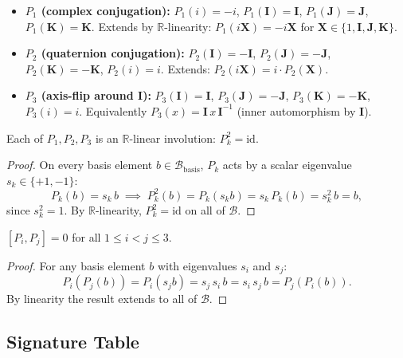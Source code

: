 \begin{itemize}
  \item \textbf{$P_1$ (complex conjugation):}
    $P_1(i) = -i$,\; $P_1(\mathbf{I}) = \mathbf{I}$,\;
    $P_1(\mathbf{J}) = \mathbf{J}$,\; $P_1(\mathbf{K}) = \mathbf{K}$.
    Extends by $\mathbb{R}$-linearity: $P_1(i\mathbf{X}) = -i\mathbf{X}$
    for $\mathbf{X} \in \{1, \mathbf{I}, \mathbf{J}, \mathbf{K}\}$.

  \item \textbf{$P_2$ (quaternion conjugation):}
    $P_2(\mathbf{I}) = -\mathbf{I}$,\;
    $P_2(\mathbf{J}) = -\mathbf{J}$,\;
    $P_2(\mathbf{K}) = -\mathbf{K}$,\; $P_2(i) = i$.
    Extends: $P_2(i\mathbf{X}) = i\cdot P_2(\mathbf{X})$.

  \item \textbf{$P_3$ (axis-flip around $\mathbf{I}$):}
    $P_3(\mathbf{I}) = \mathbf{I}$,\;
    $P_3(\mathbf{J}) = -\mathbf{J}$,\;
    $P_3(\mathbf{K}) = -\mathbf{K}$,\; $P_3(i) = i$.
    Equivalently $P_3(x) = \mathbf{I}\, x\, \mathbf{I}^{-1}$ (inner automorphism by $\mathbf{I}$).
\end{itemize}

\begin{lemma}[Involutions]
  \label{lem:involutions}
  Each of $P_1, P_2, P_3$ is an $\mathbb{R}$-linear involution: $P_k^2 = \mathrm{id}$.
\end{lemma}

\begin{proof}
  On every basis element $b \in \mathcal{B}_\mathrm{basis}$, $P_k$ acts by a
  scalar eigenvalue $s_k \in \{+1, -1\}$:
  \[
    P_k(b) = s_k\, b \;\implies\; P_k^2(b) = P_k(s_k b) = s_k\, P_k(b)
    = s_k^2\, b = b,
  \]
  since $s_k^2 = 1$. By $\mathbb{R}$-linearity, $P_k^2 = \mathrm{id}$ on
  all of $\mathcal{B}$.
\end{proof}

\begin{lemma}
  \label{lem:commutativity}
  $[P_i, P_j] = 0$ for all $1 \le i < j \le 3$.
\end{lemma}

\begin{proof}
  For any basis element $b$ with eigenvalues $s_i$ and $s_j$:
  \[
    P_i(P_j(b)) = P_i(s_j b) = s_j\, s_i\, b = s_i\, s_j\, b = P_j(P_i(b)).
  \]
  By linearity the result extends to all of $\mathcal{B}$.
\end{proof}

\subsection{Signature Table}

